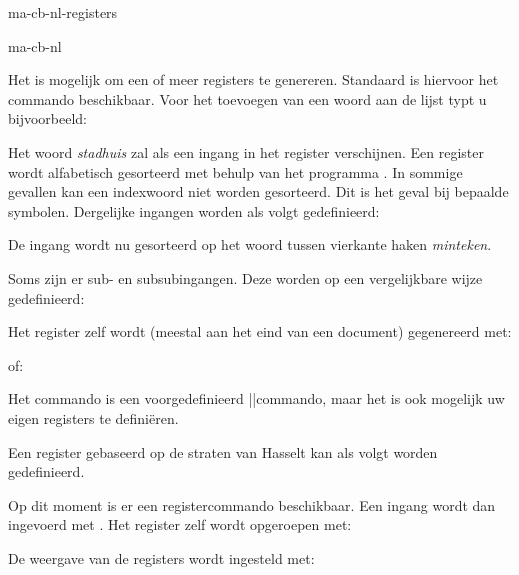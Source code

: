 \startonderdeel ma-cb-nl-registers

\produkt ma-cb-nl




Het is mogelijk om een of meer registers te genereren.
Standaard is hiervoor het commando \type{\index}
beschikbaar. Voor het toevoegen van een woord aan de lijst
typt u bijvoorbeeld:

\starttypen
{}
\stoptypen

Het woord {\em stadhuis} zal als een ingang in het register
verschijnen. Een register wordt alfabetisch gesorteerd met
behulp van het programma \TEXUTIL. In sommige gevallen kan
een indexwoord niet worden gesorteerd. Dit is het geval bij
bepaalde symbolen. Dergelijke ingangen worden als volgt
gedefinieerd:

\starttypen
\index[minteken]{$-$}
\stoptypen

De ingang wordt nu gesorteerd op het woord tussen vierkante
haken {\em minteken}.

Soms zijn er sub- en  subsubingangen. Deze worden op een
vergelijkbare wijze gedefinieerd:

\starttypen
{}
\stoptypen

Het register zelf wordt (meestal aan het eind van een
document) gegenereerd met:

\starttypen
\plaatsindex
\stoptypen

of:

\starttypen
\volledigeindex
\stoptypen

Het commando \type{\index} is een voorgedefinieerd
\CONTEXT||commando, maar het is ook mogelijk uw eigen
registers te defini\"eren.


Een register gebaseerd op de straten van Hasselt kan als
volgt worden gedefinieerd.

\starttypen
{}
\stoptypen

Op dit moment is er een registercommando \type{\straat}
beschikbaar. Een ingang wordt dan ingevoerd met
. Het register zelf wordt
opgeroepen met:

\starttypen
\plaatsstraat
\volledigestraat
\plaatsregister[straat]
\stoptypen

De weergave van de registers wordt ingesteld met:


\stoponderdeel
